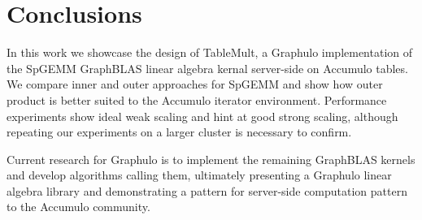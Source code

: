 \section{Conclusions}
\label{sConclusions}

In this work we showcase the design of TableMult, a Graphulo implementation of the 
SpGEMM GraphBLAS linear algebra kernal server-side on Accumulo tables.
We compare inner and outer approaches for SpGEMM and show how outer product is better
suited to the Accumulo iterator environment.
Performance experiments show ideal weak scaling and hint at good strong scaling,
although repeating our experiments on a larger cluster is necessary to confirm.

Current research for Graphulo is to implement the remaining GraphBLAS kernels 
and develop algorithms calling them, %
ultimately presenting a Graphulo linear algebra library 
and demonstrating a pattern for server-side computation pattern
to the Accumulo community.
